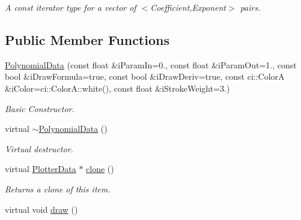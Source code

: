 \begin{DoxyCompactItemize}
\begin{DoxyCompactList}\small\item\em A const iterator type for a vector of $<$Coefficient,Exponent$>$ pairs. \end{DoxyCompactList}\end{DoxyCompactItemize}
\subsection*{Public Member Functions}
\begin{DoxyCompactItemize}
\item 
\hypertarget{class_polynomial_data_a2daf3355859ebb0886433ceab3276a7f}{\hyperlink{class_polynomial_data_a2daf3355859ebb0886433ceab3276a7f}{Polynomial\-Data} (const float \&i\-Param\-In=0., const float \&i\-Param\-Out=1., const bool \&i\-Draw\-Formula=true, const bool \&i\-Draw\-Deriv=true, const ci\-::\-Color\-A \&i\-Color=ci\-::\-Color\-A\-::white(), const float \&i\-Stroke\-Weight=3.)}\label{class_polynomial_data_a2daf3355859ebb0886433ceab3276a7f}

\begin{DoxyCompactList}\small\item\em Basic Constructor. \end{DoxyCompactList}\item 
\hypertarget{class_polynomial_data_ae89bd56d2a8c7237b4688b4139f994cf}{virtual \hyperlink{class_polynomial_data_ae89bd56d2a8c7237b4688b4139f994cf}{$\sim$\-Polynomial\-Data} ()}\label{class_polynomial_data_ae89bd56d2a8c7237b4688b4139f994cf}

\begin{DoxyCompactList}\small\item\em Virtual destructor. \end{DoxyCompactList}\item 
\hypertarget{class_polynomial_data_ae6d60ae0791f477e4fd59d6694a38c2e}{virtual \hyperlink{class_plotter_data}{Plotter\-Data} $\ast$ \hyperlink{class_polynomial_data_ae6d60ae0791f477e4fd59d6694a38c2e}{clone} ()}\label{class_polynomial_data_ae6d60ae0791f477e4fd59d6694a38c2e}

\begin{DoxyCompactList}\small\item\em Returns a clone of this item. \end{DoxyCompactList}\item 
\hypertarget{class_polynomial_data_ad47bf7c086d64fef6c01e5542f47da79}{virtual void \hyperlink{class_polynomial_data_ad47bf7c086d64fef6c01e5542f47da79}{draw} ()}\label{class_polynomial_data_ad47bf7c086d64fef6c01e5542f47da79}


\end{DoxyCompactItemize}
